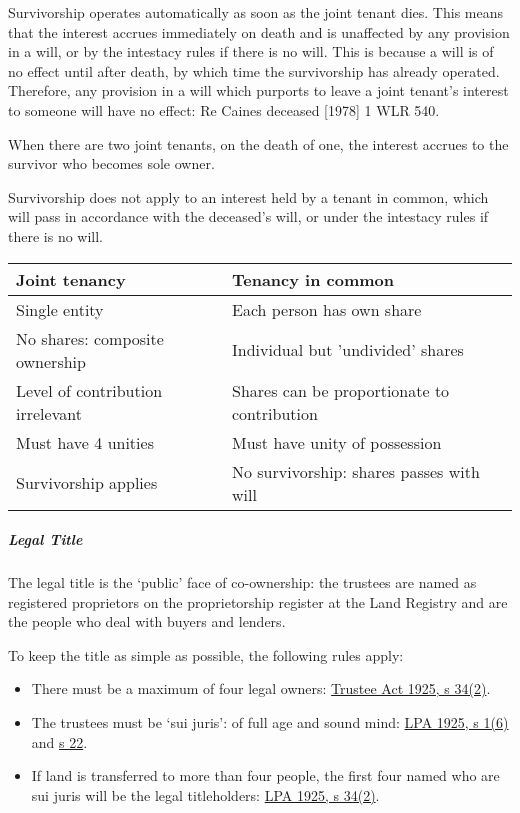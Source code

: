 \documentclass[
]{article}
\providecommand{\tightlist}{%
  \setlength{\itemsep}{0pt}\setlength{\parskip}{0pt}}
\begin{document}
Survivorship operates automatically as soon as the joint tenant dies.
This means that the interest accrues immediately on death and is
unaffected by any provision in a will, or by the intestacy rules if
there is no will. This is because a will is of no effect until after
death, by which time the survivorship has already operated. Therefore,
any provision in a will which purports to leave a joint tenant's
interest to someone will have no effect: Re Caines deceased {[}1978{]} 1
WLR 540.

When there are two joint tenants, on the death of one, the interest
accrues to the survivor who becomes sole owner.

Survivorship does not apply to an interest held by a tenant in common,
which will pass in accordance with the deceased's will, or under the
intestacy rules if there is no will.

\begin{longtable}[]{@{}ll@{}}
\toprule()
Joint tenancy & Tenancy in common \\
\midrule()
\endhead
Single entity & Each person has own share \\
No shares: composite ownership & Individual but 'undivided' shares \\
Level of contribution irrelevant & Shares can be proportionate to
contribution \\
Must have 4 unities & Must have unity of possession \\
Survivorship applies & No survivorship: shares passes with will \\
\bottomrule()
\end{longtable}

\hypertarget{legal-title}{%
\subparagraph{Legal Title}\label{legal-title}}

The legal title is the `public' face of co-ownership: the trustees are
named as registered proprietors on the proprietorship register at the
Land Registry and are the people who deal with buyers and lenders.

To keep the title as simple as possible, the following rules apply:

\begin{itemize}
\tightlist
\item
  There must be a maximum of four legal owners:
  \href{https://www.legislation.gov.uk/ukpga/Geo5/15-16/19/section/34}{Trustee
  Act 1925, s 34(2)}.
\item
  The trustees must be `sui juris': of full age and sound mind:
  \href{https://www.legislation.gov.uk/ukpga/Geo5/15-16/20/section/1}{LPA
  1925, s 1(6)} and
  \href{https://www.legislation.gov.uk/ukpga/Geo5/15-16/20/section/22}{s
  22}.
\item
  If land is transferred to more than four people, the first four named
  who are sui juris will be the legal titleholders:
  \href{https://www.legislation.gov.uk/ukpga/Geo5/15-16/20/section/1}{LPA
  1925, s 34(2)}.
\end{itemize}
\end{document}
